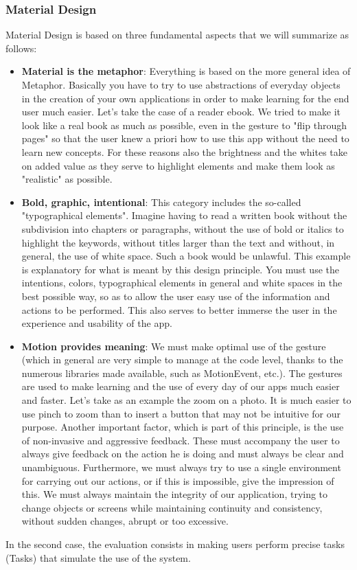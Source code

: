 \subsubsection{Material Design}
Material Design is based on three fundamental aspects that we will summarize as follows:
\begin{itemize}
	\item \textbf{Material is the metaphor}:
	Everything is based on the more general idea of Metaphor. Basically you have to try to use abstractions of everyday objects in the creation of your own applications in order to make learning for the end user much easier. Let's take the case of a reader ebook. We tried to make it look like a real book as much as possible, even in the gesture to "flip through pages" so that the user knew a priori how to use this app without the need to learn new concepts. For these reasons also the brightness and the whites take on added value as they serve to highlight elements and make them look as "realistic" as possible.
	\item \textbf{Bold, graphic, intentional}:
	This category includes the so-called "typographical elements". Imagine having to read a written book without the subdivision into chapters or paragraphs, without the use of bold or italics to highlight the keywords, without titles larger than the text and without, in general, the use of white space. Such a book would be unlawful. This example is explanatory for what is meant by this design principle. You must use the intentions, colors, typographical elements in general and white spaces in the best possible way, so as to allow the user easy use of the information and actions to be performed.
	This also serves to better immerse the user in the experience and usability of the app.
	\item \textbf{Motion provides meaning}:
	We must make optimal use of the gesture (which in general are very simple to manage at the code level, thanks to the numerous libraries made available, such as MotionEvent, etc.). The gestures are used to make learning and the use of every day of our apps much easier and faster. Let's take as an example the zoom on a photo. It is much easier to use pinch to zoom than to insert a button that may not be intuitive for our purpose. Another important factor, which is part of this principle, is the use of non-invasive and aggressive feedback. These must accompany the user to always give feedback on the action he is doing and must always be clear and unambiguous. Furthermore, we must always try to use a single environment for carrying out our actions, or if this is impossible, give the impression of this. We must always maintain the integrity of our application, trying to change objects or screens while maintaining continuity and consistency, without sudden changes, abrupt or too excessive.
\end{itemize}
In the second case, the evaluation consists in making users perform precise tasks (Tasks) that simulate the use of the system.